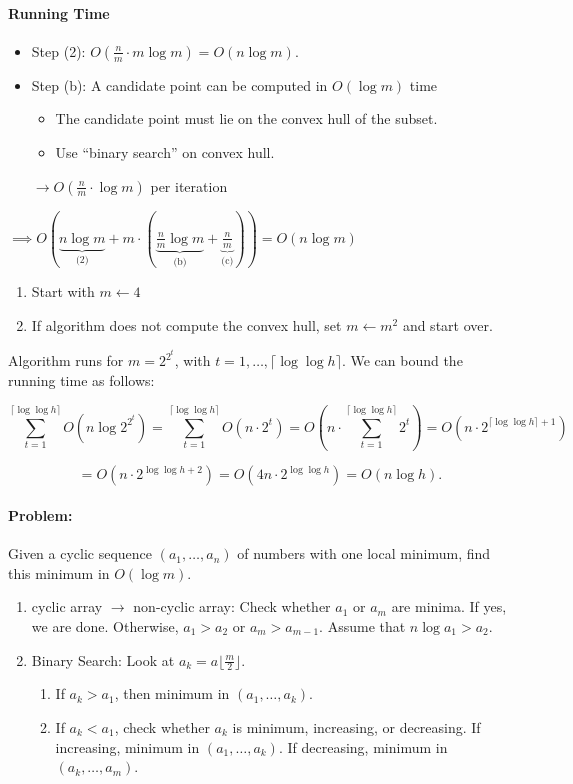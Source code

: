 \paragraph{Running Time}
\begin{itemize}
	\item Step (2): $O(\frac{n}{m} \cdot m \log m) = O(n \log m)$.
	\item Step (b): A candidate point can be computed in $O(\log m)$ time
	\begin{itemize}
		\item The candidate point must lie on the convex hull of the subset. 
		\item Use ``binary search'' on convex hull.
	\end{itemize}
	$\rightarrow O(\frac{n}{m} \cdot \log m)$ per iteration
\end{itemize}
$\implies O(\underbrace{n \log m}_\text{(2)} + m \cdot ( \underbrace{\frac{n}{m} \log m}_\text{(b)} + \underbrace{\frac{n}{m}}_\text{(c)} )) = O(n \log m)$

\begin{enumerate}
	\item Start with $m\gets 4$
	\item If algorithm does not compute the convex hull, set $m \gets m^2$ and start over.
\end{enumerate}

Algorithm runs for $m=2^{2^t}$, with $t = 1,\ldots,\lceil \log \log h \rceil$.  We can bound the running time as follows:

$$\sum\limits_{t=1}^{\lceil \log \log h \rceil} O(n \log 2^{2^t}) = \sum\limits_{t=1}^{\lceil \log \log h \rceil} O(n \cdot 2^t) = O(n \cdot \sum\limits_{t=1}^{\lceil \log \log h \rceil} 2^t) = O(n \cdot 2^{\lceil \log \log h\rceil + 1})$$

$$ = O(n \cdot 2^{\log \log h + 2}) = O(4n\cdot 2^{\log \log h}) = O(n \log h).$$
 


\paragraph{Problem:} Given a cyclic sequence $(a_1, \ldots, a_n)$ of numbers with one local minimum, find this minimum in $O(\log m)$.

\begin{enumerate}
	\item cyclic array $\rightarrow$ non-cyclic array: Check whether $a_1$ or $a_m$ are minima. If yes, we are done. Otherwise, $a_1 > a_2$ or $a_m > a_{m-1}$. Assume that $n \log a_1 > a_2$. 
	\item Binary Search: Look at $a_k = a \lfloor \frac{m}{2} \rfloor$.
	\begin{enumerate}
		\item If $a_k > a_1$, then minimum in $(a_1, \ldots, a_k)$.
		\item If $a_k < a_1$, check whether $a_k$ is minimum, increasing, or decreasing. If increasing, minimum in $(a_1, \ldots, a_k)$. If decreasing, minimum in $(a_k, \ldots, a_m)$.
	\end{enumerate}
\end{enumerate}

